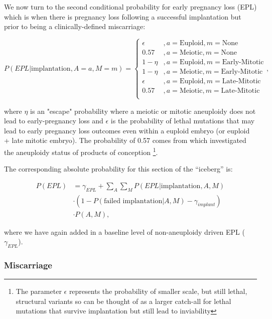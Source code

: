 \documentclass{article}
\begin{document}
We now turn to the second conditional probability for early pregnancy loss (EPL) which is when there is pregnancy loss following a successful implantation but prior to being a clinically-defined miscarriage:

\begin{equation}
	P(EPL | \text{implantation}, A=a, M=m) = \begin{cases}
	\epsilon &, a= \text{Euploid}, m=\text{None}\\
	0.57 &, a = \text{Meiotic}, m=\text{None}\\
	1 - \eta &, a = \text{Euploid}, m=\text{Early-Mitotic}\\
	1 - \eta &, a = \text{Meiotic}, m=\text{Early-Mitotic}\\
	\epsilon &, a = \text{Euploid}, m=\text{Late-Mitotic}\\
	0.57 &, a = \text{Meiotic}, m=\text{Late-Mitotic}\\
	\end{cases},
\end{equation}

where $\eta$ is an "escape" probability where a meiotic or mitotic aneuploidy does not lead to early-pregnancy loss and $\epsilon$ is the probability of lethal mutations that may lead to early pregnancy loss outcomes even within a euploid embryo (or euploid + late mitotic embryo). The probability of 0.57 comes from \citep{Gu2021-tk} which investigated the aneuploidy status of products of conception \footnote{The parameter $\epsilon$ represents the probability of smaller scale, but still lethal, structural variants so can be thought of as a larger catch-all for lethal mutations that survive implantation but still lead to inviability}. 

The corresponding absolute probability for this section of the ``iceberg'' is: 

\begin{equation}
\begin{aligned}
P(EPL) &=  \gamma_{EPL} + \sum_{A}\sum_{M} P(EPL | \text{implantation}, A, M) \\
&\cdot (1 - P(\text{failed implantation} | A, M) - \gamma_{implant})\\ 
&\cdot P(A, M),
\end{aligned}
\end{equation}

where we have again added in a baseline level of non-aneuploidy driven EPL ($\gamma_{EPL}$). 

\subsubsection*{Miscarriage}
\end{document}
